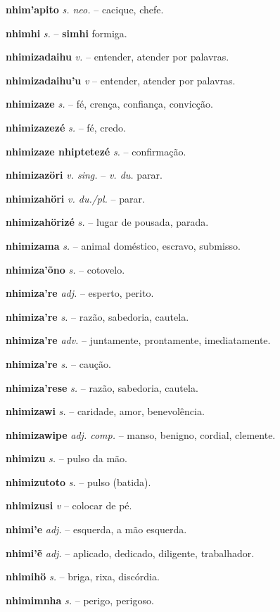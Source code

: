 \textbf{nhim'apito} \textit{s. neo.} -- cacique, chefe.

\textbf{nhimhi} \textit{s.} -- \textbf{simhi} formiga.

\textbf{nhimizadaihu} \textit{v.} -- entender, atender por palavras.

\textbf{nhimizadaihu'u} \textit{v} -- entender, atender por palavras.

\textbf{nhimizaze} \textit{s.} -- fé, crença, confiança, convicção.

\textbf{nhimizazezé} \textit{s.} -- fé, credo.

\textbf{nhimizaze nhiptetezé} \textit{s.} -- confirmação.

\textbf{nhimizazöri} \textit{v. sing.} -- \textit{v. du.} parar.

\textbf{nhimizahöri} \textit{v. du./pl.} -- parar.

\textbf{nhimizahörizé} \textit{s.} -- lugar de pousada, parada.

\textbf{nhimizama} \textit{s.} -- animal doméstico, escravo, submisso.

\textbf{nhimiza'õno} \textit{s.} -- cotovelo.

\textbf{nhimiza're} \textit{adj.} -- esperto, perito.

\textbf{nhimiza're} \textit{s.} -- razão, sabedoria, cautela.

\textbf{nhimiza're} \textit{adv.} -- juntamente, prontamente, imediatamente.

\textbf{nhimiza're} \textit{s.} -- caução.

\textbf{nhimiza'rese} \textit{s.} -- razão, sabedoria, cautela.

\textbf{nhimizawi} \textit{s.} -- caridade, amor, benevolência.

\textbf{nhimizawipe} \textit{adj. comp.} -- manso, benigno, cordial, clemente.

\textbf{nhimizu} \textit{s.} -- pulso da mão.

\textbf{nhimizutoto} \textit{s.} -- pulso (batida).

\textbf{nhimizusi} \textit{v} -- colocar de pé.

\textbf{nhimi'e} \textit{adj.} -- esquerda, a mão esquerda.

\textbf{nhimi'ẽ} \textit{adj.} -- aplicado, dedicado, diligente, trabalhador.

\textbf{nhimihö} \textit{s.} -- briga, rixa, discórdia.

\textbf{nhimimnha} \textit{s.} -- perigo, perigoso.

